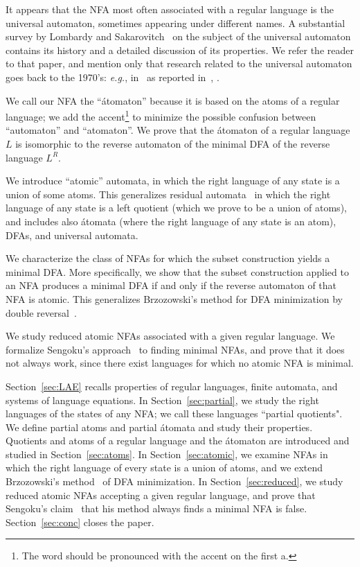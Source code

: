 \documentclass[preprint,12pt]{elsarticle}
\newcommand{\eg}{\mbox{\it e.g.}}
\begin{document}
It appears that the NFA most often associated with a regular language is 
the universal automaton, sometimes  appearing under different names. 
A substantial survey by Lombardy and Sakarovitch~\cite{LoSa07} on the subject 
of the universal automaton contains its history and a detailed discussion 
of its properties. We refer the reader to that paper, and mention only that 
research related to the universal automaton goes back to the 
1970's: \eg, in~\cite{Car70} as reported in~\cite{ADN92}, \cite{Con71,KaWe70}.

We call our NFA the ``\'atomaton'' because it is based on the atoms of a regular language; 
we add the accent\footnote{The word should be pronounced with 
the accent on the first a.} to minimize the possible confusion between ``automaton'' and ``atomaton''.
We prove that the \'atomaton of a regular language $L$ is isomorphic to the reverse 
automaton of the minimal DFA of the reverse language $L^R$.

We  introduce ``atomic'' automata, in which the right language of any state is 
a union of some atoms. 
This generalizes residual automata~\cite{DLT02} 
in which the right language of any state is a left quotient (which we prove 
to be a union of atoms), and includes also  \'atomata (where the right language 
of any state is an atom), DFAs, and universal automata.

We characterize the class of NFAs for which the subset construction 
yields a minimal DFA. More specifically, we show that the subset construction 
applied to an NFA produces a minimal DFA if and only if the reverse automaton 
of that NFA is atomic. 
This generalizes Brzozowski's method for DFA minimization by double reversal~\cite{Brz63}.

We study reduced atomic NFAs associated with a given regular language. We formalize Sengoku's approach~\cite{Sen92} to finding minimal NFAs, and prove that it does not always work, since there exist languages for which no atomic NFA is minimal.

Section~\ref{sec:LAE} recalls properties of regular languages, finite automata, and systems of language equations.
In Section~\ref{sec:partial}, we study the right languages of the states of any NFA; we call these languages ``partial quotients". We define partial atoms and partial \'atomata and study their properties.
Quotients and atoms of a regular language and the \'atomaton are introduced and 
studied in Section~\ref{sec:atoms}.
In Section~\ref{sec:atomic}, we examine NFAs in which the right language of every state is a union of atoms, and we extend
Brzozowski's method~\cite{Brz63} of DFA minimization.
In Section~\ref{sec:reduced}, we study reduced atomic NFAs accepting a given regular language, and prove that Sengoku's claim~\cite{Sen92} that his method always finds a minimal NFA is false.
Section~\ref{sec:conc} closes the paper.
\end{document}
